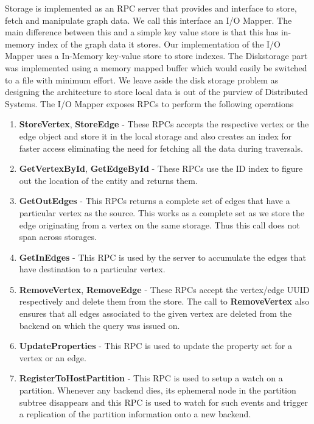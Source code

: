 \documentclass[letterpaper, 11 pt, conference]{ieeeconf}  %
\begin{document}
Storage is implemented as an RPC server that provides and interface to store, fetch and manipulate graph data. We call this interface an I/O Mapper. The main difference between this and a simple key value store is that this has in-memory index of the graph data it stores. Our implementation of the I/O Mapper uses a In-Memory key-value store to store indexes. The Diskstorage part was implemented using a memory mapped buffer which would easily be switched to a file with minimum effort. We leave aside the disk storage problem as designing the architecture to store local data is out of the purview of Distributed Systems. The I/O Mapper exposes RPCs to perform the following operations
\begin{enumerate}
\item \textbf{StoreVertex}, \textbf{StoreEdge} - These RPCs accepts the respective vertex or the edge object and store it in the local storage and also creates an index for faster access eliminating the need for fetching all the data during traversals. 
\item \textbf{GetVertexById}, \textbf{GetEdgeById} - These RPCs use the ID index to figure out the location of the entity and returns them.
\item \textbf{GetOutEdges} - This RPCs returns a complete set of edges that have a particular vertex as the source. This works as a complete set as we store the edge originating from a vertex on the same storage. Thus this call does not span across storages.
\item \textbf{GetInEdges} - This RPC is used by the server to accumulate the edges that have destination to a particular vertex. 
\item \textbf{RemoveVertex}, \textbf{RemoveEdge} - These RPCs accept the vertex/edge UUID respectively and delete them from the store. The call to \textbf{RemoveVertex} also ensures that all edges associated to the given vertex are deleted from the backend on which the query was issued on.
\item \textbf{UpdateProperties} - This RPC is used to update the property set for a vertex or an edge.
\item \textbf{RegisterToHostPartition} - This RPC is used to setup a watch on a partition. Whenever any backend dies, its ephemeral node in the partition subtree disappears and this RPC is used to watch for such events and trigger a replication of the partition information onto a new backend. 
\end{enumerate}
\end{document}

